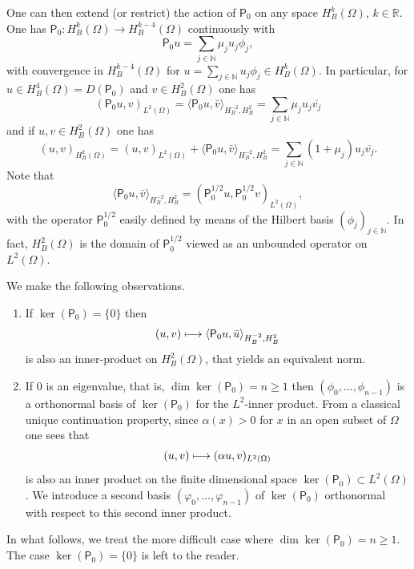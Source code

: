 \documentclass[JEP,XML,SOM,Unicode,published]{cedram}
\newcommand\mto{\mathchoice{\longmapsto}{\mapsto}{\mapsto}{\mapsto}}
\theoremstyle{plain}
\theoremstyle{definition}
\def\R{\mathbb{R}}
\def\N{\mathbb{N}}
\newcommand{\ovl}[1]{\overline{#1}}
\newcommand{\inp}[2]{(#1, #2)}
\newcommand{\dup}[2]{\langle #1 , #2 \rangle}
\newcommand{\Pell}{\mathsf P_0}
\begin{document}
One can then extend (or restrict) the action of $\Pell$ on any space
$H^k_B(\Omega)$, $k \in \R$. One has $\Pell: H^k_B(\Omega) \to
H^{k-4}_B(\Omega)$ continuously with
\begin{equation}
\label{eq: action P}
\Pell u = \sum_{j\in \N}\mu_j u_j \phi_j,
\end{equation}
with convergence in $H^{k-4}_B(\Omega)$ for $u = \sum_{j\in \N}u_j \phi_j
\in H^k_B(\Omega)$.
In particular, for $u \in H^4_B(\Omega)= D(\Pell)$ and $v \in H^{2}_B(\Omega)$
one has
\begin{equation}
\label{eq: pseudo-norm}
\inp{\Pell u }{v}_{L^2(\Omega)} = \dup{\Pell u }{\bar{v}}_{H^{-2}_B,
H^{2}_B}
= \sum_{j \in \N} \mu_j u_j \ovl{v_j}
\end{equation}
and if $u,v \in H^{2}_B(\Omega)$ one has
\begin{equation}
\label{eq: norm H2B}
\inp{u}{v}_{H^{2}_B(\Omega)} = \inp{u }{v}_{L^2(\Omega)}
+ \dup{\Pell u }{\bar{v}}_{H^{-2}_B, H^{2}_B}
= \sum_{j \in \N} (1+\mu_j) u_j \ovl{v_j}.
\end{equation}
Note that
\begin{equation}
\label{eq: norm H2B-bis}
\dup{\Pell u }{\bar{v}}_{H^{-2}_B, H^{2}_B}
= \inp{\Pell^{1/2} u}{\Pell^{1/2} v}_{L^2(\Omega)},
\end{equation}
with the operator $\Pell^{1/2}$ easily defined by means of the Hilbert
basis $(\phi_j)_{j \in \N}$. In fact, $H^{2}_B(\Omega)$ is the domain
of $\Pell^{1/2}$ viewed as an unbounded operator on $L^2(\Omega)$.

We make the following observations.
\begin{enumerate}
\item
If $\ker (\Pell) = \{0\}$ then
\begin{equation*}
(u,v) \mto \dup{\Pell u }{\bar{u}}_{H^{-2}_B, H^{2}_B}
\end{equation*}
is also an inner-product on $H^{2}_B(\Omega)$, that yields an
equivalent norm.

\item
If $0$ is an eigenvalue, that is,
$\dim \ker(\Pell)= n\geq 1$ then $(\phi_0, \dots, \phi_{n-1})$ is a
orthonormal basis of $\ker(\Pell)$ for the $L^2$-inner product.
From a classical unique continuation
property, since $\alpha(x) >0$ for $x$ in an open subset of $\Omega$ one sees that
\begin{equation}
\label{eq: second inner product ker P}
(u,v) \mto \inp{\alpha u}{v}_{L^2(\Omega)}
\end{equation} is also an inner product on
the finite dimensional space $\ker(\Pell) \subset L^2(\Omega)$.
We introduce a second basis $(\varphi_0, \dots, \varphi_{n-1})$ of $\ker(\Pell)$ orthonormal with respect to this second
inner product.
\end{enumerate}
In what follows, we treat the more difficult case where $\dim
\ker(\Pell)= n\geq 1$. The case $\ker (\Pell)=\{0\}$ is left to the
reader.
\end{document}
